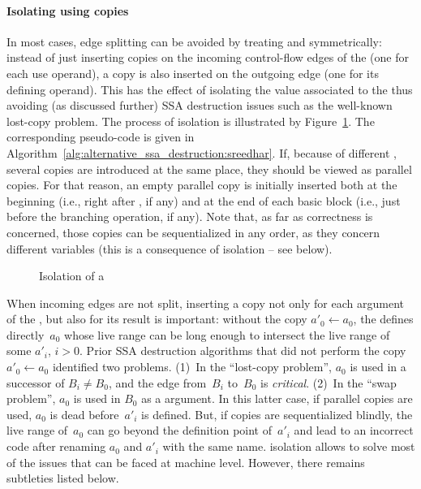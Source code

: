 \paragraph{Isolating \phinode using copies}
In most cases, edge splitting can be avoided by treating \phiuses and \phidef symmetrically: 
instead of just inserting copies on the incoming control-flow edges of the \emph{\phinode} (one for each use operand), a copy is also inserted on the outgoing edge (one for its defining operand). 
This has the effect of isolating the value associated to the \phinode thus avoiding (as discussed further) SSA destruction issues such as the well-known lost-copy problem. 
The process of \phinode isolation is illustrated by Figure~\ref{fig:phi_isolation}. 
The corresponding pseudo-code is given in Algorithm~\ref{alg:alternative_ssa_destruction:sreedhar}. 
If, because of different \phifuns, several copies are introduced at the same place, they should be viewed as parallel copies. 
For that reason, an empty parallel copy is initially inserted both at the beginning (i.e., right after \phifuns, if any) and at the end of each basic block (i.e., just before the branching operation, if any). 
Note that, as far as correctness is concerned, those copies can be sequentialized in any order, as they concern different variables (this is a consequence of \phinode isolation -- see below).

\begin{figure}[h]
  \hfill
{}\hfill
{}
\hfill\strut
\caption{Isolation of a \phinode\label{fig:phi_isolation}}
\end{figure}


When incoming edges are not split, inserting a copy not only for each argument of the \phifun, but also for its result is important: 
without the copy $a'_0\gets a_0$, the \phifun defines directly~$a_0$ whose live range can be long enough to intersect the live range of some $a'_i$, $i>0$. 
Prior SSA destruction algorithms that did not perform the copy  $a'_0\gets a_0$ identified two problems.
(1)~In the ``lost-copy problem'',  $a_0$ is used in a successor of $B_i \neq B_0$, and the edge from~$B_i$ to~$B_0$ is \emph{critical}.
(2)~In the ``swap problem'', $a_0$ is used in $B_0$ as a \phifun argument. 
In this latter case, if parallel copies are used, $a_0$ is dead before~$a'_i$ is defined.
But, if copies are sequentialized blindly, the live range of~$a_0$ can go beyond the definition point of~$a'_i$ and lead to an incorrect code after renaming $a_0$ and $a'_i$ with the same name. 
\phinode isolation allows to solve most of the issues that can be faced at machine level. 
However, there remains subtleties listed below.


